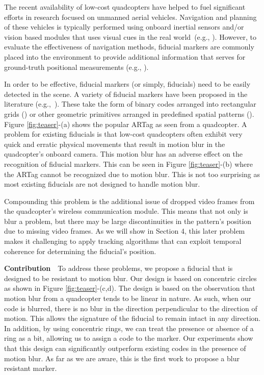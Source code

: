 \documentclass[runningheads]{llncs}
\begin{document}
The recent availability of low-cost quadcopters have helped to fuel significant
efforts in research focused on unmanned aerial vehicles. Navigation and planning of
these vehicles is typically performed using onboard inertial sensors and/or
vision based modules that uses visual cues in the real world~(e.g.,
\cite{Davison:2007,Engel12,Engel13}). However, to evaluate the effectiveness of
navigation methods, fiducial markers are commonly placed into the environment
to provide additional information that serves for ground-truth positional
measurements (e.g., \cite{Bosnak:2012,Lim09,Klopschitz:2007}).

In order to be effective, fiducial markers (or simply, fiducials) need
to be easily detected in the scene. A variety of fiducial markers
have been proposed in the literature
(e.g.,~\cite{NaimarkF02,ARToolkit02,Fiala05,Pitag13,runetag11}).
These take the form of binary codes arranged into rectangular grids (\cite{ARToolkit02,Fiala05})
or other geometric primitives arranged in predefined spatial patterns
(\cite{NaimarkF02,Pitag13,runetag11}).
Figure \ref{fig:teaser}-(a) shows the popular ARTag \cite{Fiala05} as
seen from a quadcopter. A problem for existing fiducials is that low-cost quadcopters
often exhibit very quick and erratic physical movements that
result in motion blur in the quadcopter's onboard camera. This motion blur has
an adverse effect on the recognition of fiducial markers. This can be seen in
Figure \ref{fig:teaser}-(b) where the ARTag cannot be recognized due to motion
blur. This is not too surprising as most existing fiducials are not
designed to handle motion blur.

Compounding this problem is the additional issue of dropped video frames from
the quadcopter's wireless communication module. This means that not only is
blur a problem, but there may be large discontinuities in the pattern's
position due to missing video frames. As we will show in Section 4, this later problem
makes it challenging to apply tracking algorithms that can exploit temporal
coherence for determining the fiducial's position.

\noindent\textbf{Contribution}~~To address these problems, we propose a
fiducial that is designed to be resistant to motion blur. Our design is based on
concentric circles as shown in Figure \ref{fig:teaser}-(c,d). The design is based
on the observation that motion blur from a quadcopter tends to be linear in
nature. As such, when our code is blurred, there is no blur in the direction
perpendicular to the direction of motion.  This allows the signature of the
fiducial to remain intact in any direction. In addition, by using concentric
rings, we can treat the presence or absence of a ring as a bit, allowing us to
assign a code to the marker. Our experiments show that this design can
significantly outperform existing codes in the presence of motion blur. As far
as we are aware, this is the first work to propose a blur resistant marker.
\end{document}
